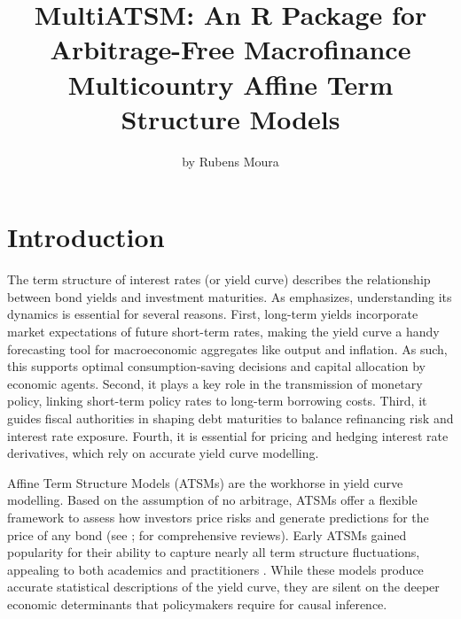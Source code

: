 \title{MultiATSM: An R Package for Arbitrage-Free Macrofinance Multicountry Affine Term Structure Models}


\author{by Rubens Moura}

\maketitle


\section{Introduction}\label{introduction}

The term structure of interest rates (or yield curve) describes the relationship between bond yields and investment maturities. As \citet{Piazzesi2010} emphasizes, understanding its dynamics is essential for several reasons. First, long-term yields incorporate market expectations of future short-term rates, making the yield curve a handy forecasting tool for macroeconomic aggregates like output and inflation. As such, this supports optimal consumption-saving decisions and capital allocation by economic agents. Second, it plays a key role in the transmission of monetary policy, linking short-term policy rates to long-term borrowing costs. Third, it guides fiscal authorities in shaping debt maturities to balance refinancing risk and interest rate exposure. Fourth, it is essential for pricing and hedging interest rate derivatives, which rely on accurate yield curve modelling.

Affine Term Structure Models (ATSMs) are the workhorse in yield curve modelling. Based on the assumption of no arbitrage, ATSMs offer a flexible framework to assess how investors price risks and generate predictions for the price of any bond (see \citet{Piazzesi2010}; \citet{GurkaynakWright2012} for comprehensive reviews). Early ATSMs gained popularity for their ability to capture nearly all term structure fluctuations, appealing to both academics and practitioners \citep{Vasicek1977, DuffieKan1996, DaiSingleton2002}. While these models produce accurate statistical descriptions of the yield curve, they are silent on the deeper economic determinants that policymakers require for causal inference.

